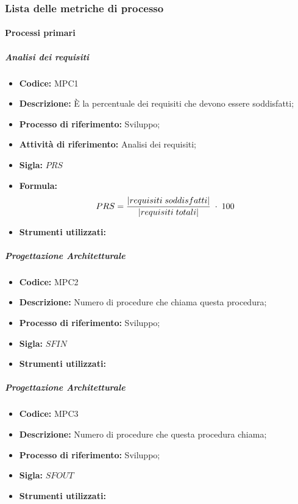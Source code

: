 \subsubsection{Lista delle metriche di processo}
\paragraph{Processi primari}
\subparagraph{Analisi dei requisiti}
    \begin{itemize}
        \item \textbf{Codice:} MPC1
        \item \textbf{Descrizione:} È la percentuale dei requisiti che devono essere soddisfatti;
        \item \textbf{Processo di riferimento:} Sviluppo;
        \item \textbf{Attività di riferimento:} Analisi dei requisiti;
        \item \textbf{Sigla:} $PRS$
        \item \textbf{Formula:} $$PRS = {|requisiti \; soddisfatti| \over |requisiti \; totali|}\; \cdot \; 100$$
        \item \textbf{Strumenti utilizzati:}
    \end{itemize}
\subparagraph{Progettazione Architetturale}
\begin{itemize}
	\item \textbf{Codice:} MPC2
	\item \textbf{Descrizione:} Numero di procedure che chiama questa procedura;
	\item \textbf{Processo di riferimento:} Sviluppo;
	\item \textbf{Sigla:} $SFIN$
	\item \textbf{Strumenti utilizzati:}
\end{itemize}
\subparagraph{Progettazione Architetturale}
\begin{itemize}
	\item \textbf{Codice:} MPC3
	\item \textbf{Descrizione:} Numero di procedure che questa procedura chiama;
	\item \textbf{Processo di riferimento:} Sviluppo;
	\item \textbf{Sigla:} $SFOUT$
	\item \textbf{Strumenti utilizzati:}
\end{itemize}
